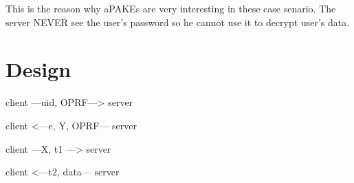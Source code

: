 \documentclass[../report.tex]{subfiles}
\begin{document}
This is the reason why aPAKEs are very interesting in these case senario. The server NEVER see the user's password so he cannot use it to decrypt user's data.

\section{Design}

client ---uid, OPRF---> server

client <---e, Y, OPRF--- server

client ---X, t1 ---> server

client <---t2, data--- server


\end{document}
